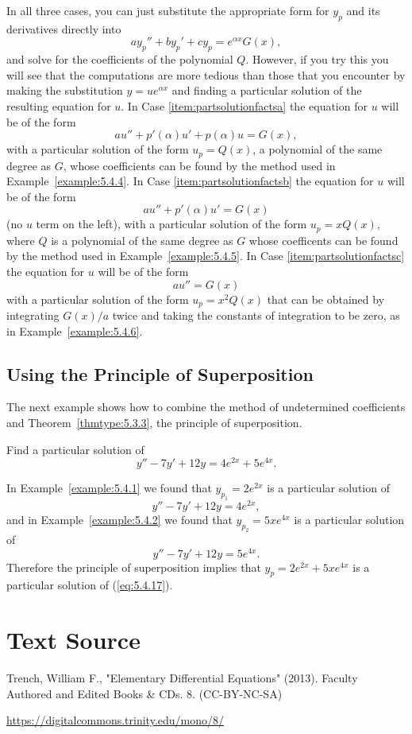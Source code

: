 \documentclass{ximera}
\begin{document}
In all three cases, you can just substitute the appropriate form for
$y_p$ and its derivatives directly into
$$
ay_p''+by_p'+cy_p=e^{\alpha x}G(x),
$$
and solve for the coefficients of the polynomial $Q$. However, if you
try this you will see that the computations are more tedious than
those that you encounter by making the substitution $y=ue^{\alpha x}$
and finding a particular solution of the resulting equation for $u$.
In Case \ref{item:partsolutionfactsa}
the equation for $u$ will be of the form
$$
au''+p'(\alpha)u'+p(\alpha)u=G(x),
$$
with a particular solution of the form $u_p=Q(x)$, a polynomial of the
same degree as $G$, whose coefficients can be found by the method used
in Example~\ref{example:5.4.4}. In Case \ref{item:partsolutionfactsb}  the equation for
$u$ will be of the form
$$
au''+p'(\alpha)u'=G(x)
$$
(no $u$ term on the left), with a particular solution of the form
$u_p=xQ(x)$, where $Q$ is a polynomial of the same degree as $G$ whose
coefficents can be found by the method used in
Example~\ref{example:5.4.5}. In Case \ref{item:partsolutionfactsc}  the equation for $u$
will be of the form
$$
au''=G(x)
$$
with a particular solution of the form $u_p=x^2Q(x)$ that can be
obtained by integrating $G(x)/a$ twice and taking the constants of
integration to be zero, as in Example~\ref{example:5.4.6}.
 
\subsection*{Using the Principle of Superposition}
 
The next example shows how to combine the method of undetermined
coefficients and Theorem~\ref{thmtype:5.3.3}, the principle of
superposition.
 
\begin{example}\label{example:5.4.7}
Find a particular solution of
\begin{equation} \label{eq:5.4.17}
y''-7y'+12y=4e^{2x}+5e^{4x}.
\end{equation}
 
 
\begin{explanation}
In Example~\ref{example:5.4.1} we found that $y_{p_1}=2e^{2x}$
is a particular solution of
$$
y''-7y'+12y=4e^{2x},
$$
and in Example~\ref{example:5.4.2} we found that $y_{p_2}=5xe^{4x}$
is a particular solution of
$$
y''-7y'+12y=5e^{4x}.
$$
Therefore the principle of superposition implies that
$y_p=2e^{2x}+5xe^{4x}$ is a particular solution of (\ref{eq:5.4.17}).
\end{explanation}
\end{example}
\section*{Text Source}
Trench, William F., "Elementary Differential Equations" (2013). Faculty Authored and Edited Books \& CDs. 8. (CC-BY-NC-SA)
 
\href{https://digitalcommons.trinity.edu/mono/8/}{https://digitalcommons.trinity.edu/mono/8/}
 
\end{document}
